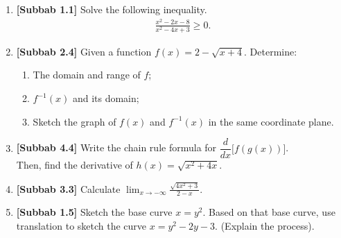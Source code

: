 \documentclass[10pt,openany,a4paper]{article}
\theoremstyle{definition}
\theoremstyle{definition}
\theoremstyle{plain}
\begin{document}
\begin{enumerate}
    \item \textbf{[Subbab 1.1]} Solve the following inequality.
    \begin{align*}
        \frac{x^2-2x-8}{x^2-4x+3}\geq 0.
    \end{align*}

    \item \textbf{[Subbab 2.4]} Given a function $f(x)=2-\sqrt{x+4}$. Determine:
    \begin{enumerate}
        \item[a)] The domain and range of $f$;
        \item[b)] $f^{-1}(x)$ and its domain;
        \item[c)] Sketch the graph of $f(x)$ and $f^{-1}(x)$ in the same coordinate plane.
    \end{enumerate}

    \item \textbf{[Subbab 4.4]} Write the chain rule formula for $\dfrac{d}{dx}\big[f(g(x))\big]$.\\
    Then, find the derivative of $h(x)=\sqrt{x^2+4x}$.

    \item \textbf{[Subbab 3.3]} Calculate $\displaystyle\lim_{x\to-\infty}\frac{\sqrt{4x^2+3}}{2-x}$.

    \item \textbf{[Subbab 1.5]} Sketch the base curve $x=y^2$. Based on that base curve, use translation to sketch the curve $x=y^2-2y-3$. (Explain the process).
\end{enumerate}

\newpage
\end{document}

